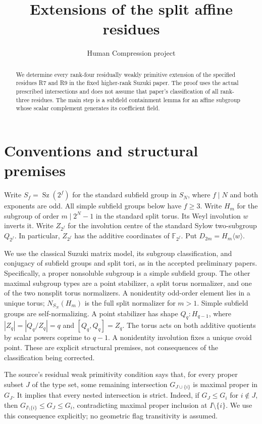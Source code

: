 \documentclass[11pt,a4paper]{article}
\title{Extensions of the split affine residues}\author{Human Compression project}\date{}
\newcommand{\Sz}{\operatorname{Sz}}\newcommand{\F}{\mathbb F}
\begin{document}
\maketitle
\begin{abstract}
We determine every rank-four residually weakly primitive extension of
the specified residues R7 and R9 in the fixed higher-rank Suzuki paper.
The proof uses the actual prescribed intersections and does not assume
that paper's classification of all rank-three residues. The main step
is a subfield containment lemma for an affine subgroup whose scalar
complement generates its coefficient field.
\end{abstract}

\section{Conventions and structural premises}
Write $S_f=\Sz(2^f)$ for the standard subfield group in $S_N$, where
$f\mid N$ and both exponents are odd. All simple subfield groups below
have $f\ge3$. Write $H_m$ for the subgroup of order $m\mid2^N-1$ in
the standard split torus. Its Weyl involution $w$ inverts it. Write
$Z_{2^f}$ for the involution centre of the standard Sylow two-subgroup
$Q_{2^f}$. In particular, $Z_{2^f}$ has the additive coordinates of
$\F_{2^f}$. Put $D_{2m}=H_m\langle w\rangle$.

We use the classical Suzuki matrix model, its subgroup classification,
and conjugacy of subfield groups and split tori, as in the accepted
preliminary papers. Specifically, a proper nonsoluble subgroup is a
simple subfield group. The other maximal subgroup types are a point
stabilizer, a split torus normalizer, and one of the two nonsplit torus
normalizers. A nonidentity odd-order element lies in a unique torus;
$N_{S_N}(H_m)$ is the full split normalizer for $m>1$. Simple subfield
groups are self-normalizing. A point stabilizer has shape
$Q_q:H_{q-1}$, where $|Z_q|=|Q_q/Z_q|=q$ and $[Q_q,Q_q]=Z_q$.
The torus acts on both additive quotients by scalar powers coprime to
$q-1$. A nonidentity involution fixes a unique ovoid point. These are
explicit structural premises, not consequences of the classification
being corrected.

The source's residual weak primitivity condition says that, for every
proper subset $J$ of the type set, some remaining intersection
$G_{J\cup\{i\}}$ is maximal proper in $G_J$. It implies that every
nested intersection is strict. Indeed, if $G_J\le G_i$ for $i\notin J$,
then $G_{I\setminus\{i\}}\le G_J\le G_i$, contradicting maximal
proper inclusion at $I\setminus\{i\}$. We use this consequence
explicitly; no geometric flag transitivity is assumed.
\end{document}
